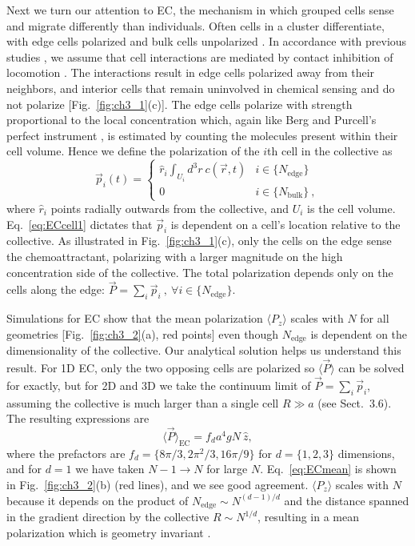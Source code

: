 Next we turn our attention to EC, the mechanism in which grouped cells sense and migrate differently than individuals.
Often cells in a cluster differentiate, with edge cells polarized and bulk cells unpolarized \cite{malet2015collective,cai2016modeling}. In accordance with previous studies \cite{camley2016emergent,varennes2016collective},
we assume that cell interactions are mediated by contact inhibition of locomotion \cite{mayor2010keeping}. The interactions result in edge cells polarized away from their neighbors, and interior cells that remain uninvolved in chemical sensing and do not polarize [Fig.\ \ref{fig:ch3_1}(c)]. The edge cells polarize with strength proportional to the local concentration which, again like Berg and Purcell's perfect instrument \cite{berg1977physics}, is estimated by counting the molecules present within their cell volume. Hence we define the polarization of the $i$th cell in the collective as
\begin{equation} \label{eq:ECcell1}
    \vec{p}_i(t) =
    \begin{cases}
         \hat{r}_i \int_{U_i} d^3r \ c(\vec{r},t) &i \in \{ N_\text{edge} \} \\
        0 &i \in \{ N_\text{bulk} \} \ ,
    \end{cases}
\end{equation}
where $\hat{r}_i$ points radially outwards from the collective, and $U_i$ is the cell volume. Eq.\ \ref{eq:ECcell1} dictates that $\vec{p}_i$ is dependent on a cell's location relative to the collective. As illustrated in Fig.\ \ref{fig:ch3_1}(c), only the cells on the edge sense the chemoattractant, polarizing with a larger magnitude on the high concentration side of the collective. The total polarization depends only on the cells along the edge:
$\vec{P} = \sum_i \vec{p}_i \ , \ \forall i \in \{N_\text{edge}\}$.

Simulations for EC show that the mean polarization $\langle P_z \rangle$ scales with $N$ for all geometries [Fig.\ \ref{fig:ch3_2}(a), red points] even though $N_\text{edge}$ is dependent on the dimensionality of the collective. Our analytical solution helps us understand this result. For 1D EC, only the two opposing cells are polarized so $\langle\vec{P}\rangle$ can be solved for exactly, but for 2D and 3D we take the continuum limit of
$\vec{P} = \sum_i \vec{p}_i$,
assuming the collective is much larger than a single cell $R \gg a$ (see Sect.\ 3.6). The resulting expressions are
\begin{equation} \label{eq:ECmean}
    \langle \vec{P} \rangle_\text{EC} = f_d a^4gN \ \hat{z},
\end{equation}
where the prefactors are $f_d = \{8\pi/3, 2\pi^2/3, 16\pi/9\}$ for $d=\{1,2,3\}$ dimensions, and for $d=1$ we have taken $N-1\to N$ for large $N$. Eq.\ \ref{eq:ECmean} is shown in Fig.\ \ref{fig:ch3_2}(b) (red lines), and we see good agreement. $\langle P_z \rangle$ scales with $N$ because it depends on the product of
$N_\text{edge} \sim N^{(d-1)/d}$
and the distance spanned in the gradient direction by the collective
$R \sim N^{1/d}$,
resulting in a mean polarization which is geometry invariant \cite{malet2015collective}.

